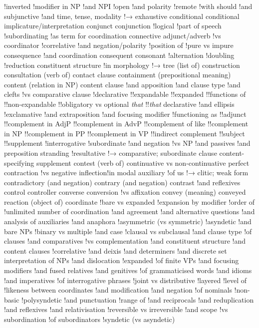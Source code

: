 !inverted
!modifier in NP
!and NPI
!open
!and polarity
!remote
!with should
!and subjunctive
!and time, tense, modality
!→ exhaustive conditional
conditional implicature/interpretation
conjunct
conjunction
!logical
!part of speech
!subordinating
!as term for coordination
connective adjunct/adverb
!vs coordinator
!correlative
!and negation/polarity
!position of
!pure vs impure
consequence
!and coordination
consequent
consonant
!alternation
!doubling
!reduction
constituent structure
!in morphology
!→ tree (list of)
construction
consultation (verb of)
contact clause
containment (prepositional meaning)
content (relation in NP)
content clause
!and apposition
!and clause type
!and clefts
!vs comparative clause
!declarative
!!expandable
!!expanded
!!functions of
!!non-expandable
!!obligatory vs optional \textit{that}
!!\textit{that} declarative
!and ellipsis
!exclamative
!and extraposition
!and focusing modifier
!functioning as
!!adjunct
!!complement in AdjP
!!complement in AdvP
!!complement of like
!!complement in NP
!!complement in PP
!!complement in VP
!!indirect complement
!!subject
!!supplement
!interrogative
!subordinate
!and negation
!vs NP
!and passives
!and preposition stranding
!resultative
!→ comparative; subordinate clause
content-specifying supplement
contest (verb of)
continuative vs non-continuative perfect
contraction
!vs negative inflection!in modal auxiliary
!of us
!→ clitic; weak form
contradictory (and negation)
contrary (and negation)
contrast
!and reflexives
control
controller
converse
conversion
!vs affixation
convey (meaning)
conveyed reaction (object of)
coordinate
!bare vs expanded
!expansion by modifier
!order of
!unlimited number of
coordination
!and agreement
!and alternative questions
!and analysis of auxiliaries
!and anaphora
!asymmetric (vs symmetric)
!asyndetic
!and bare NPs
!binary vs multiple
!and case
!clausal vs subclausal
!and clause type
!of clauses
!and comparatives
!vs complementation
!and constituent structure
!and content clauses
!correlative
!and deixis
!and determiners
!and discrete set interpretation of NPs
!and dislocation
!expanded
!of finite VPs
!and focusing modifiers
!and fused relatives
!and genitives
!of grammaticised words
!and idioms
!and imperatives
!of interrogative phrases
!joint vs distributive
!layered
!level of
!likeness between coordinates
!and modification
!and negation
!of nominals
!non-basic
!polysyndetic
!and punctuation
!range of
!and reciprocals
!and reduplication
!and reflexives
!and relativisation
!reversible vs irreversible
!and scope
!vs subordination
!of subordinators
!syndetic (vs asyndetic)
